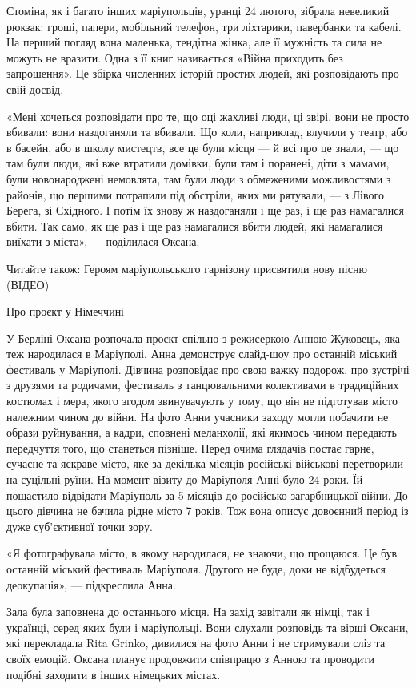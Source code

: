 Стоміна, як і багато інших маріупольців, уранці 24 лютого, зібрала невеликий
рюкзак: гроші, папери, мобільний телефон, три ліхтарики, павербанки та кабелі.
На перший погляд вона маленька, тендітна жінка, але її мужність та сила не
можуть не вразити. Одна з її книг називається «Війна приходить без запрошення».
Це збірка численних історій простих людей, які розповідають про свій досвід.

«Мені хочеться розповідати про те, що оці жахливі люди, ці звірі, вони не
просто вбивали: вони наздоганяли та вбивали. Що коли, наприклад, влучили у
театр, або в басейн, або в школу мистецтв, все це були місця — й всі про це
знали, — що там були люди, які вже втратили домівки, були там і поранені, діти
з мамами, були новонароджені немовлята, там були люди з обмеженими можливостями
з районів, що першими потрапили під обстріли, яких ми рятували, — з Лівого
Берега, зі Східного. І потім їх знову ж наздоганяли і ще раз, і ще раз
намагалися вбити. Так само, як ще раз і ще раз намагалися вбити людей, які
намагалися виїхати з міста», — поділилася Оксана.

Читайте також: Героям маріупольського гарнізону присвятили нову пісню (ВІДЕО)

Про проєкт у Німеччині

У Берліні Оксана розпочала проєкт спільно з режисеркою Анною Жуковець, яка теж
народилася в Маріуполі. Анна демонструє слайд-шоу про останній міський
фестиваль у Маріуполі. Дівчина розповідає про свою важку подорож, про зустрічі
з друзями та родичами, фестиваль з танцювальними колективами в традиційних
костюмах і мера, якого згодом звинувачують у тому, що він не підготував місто
належним чином до війни. На фото Анни учасники заходу могли побачити не образи
руйнування, а кадри, сповнені меланхолії, які якимось чином передають
передчуття того, що станеться пізніше. Перед очима глядачів постає гарне,
сучасне та яскраве місто, яке за декілька місяців російські військові
перетворили на суцільні руїни. На момент візиту до Маріуполя Анні було 24 роки.
Їй пощастило відвідати Маріуполь за 5 місяців до російсько-загарбницької війни.
До цього дівчина не бачила рідне місто 7 років. Тож вона описує довоєнний
період із дуже суб'єктивної точки зору.

«Я фотографувала місто, в якому народилася, не знаючи, що прощаюся. Це був
останній міський фестиваль Маріуполя. Другого не буде, доки не відбудеться
деокупація», — підкреслила Анна. 

Зала була заповнена до останнього місця. На захід завітали як німці, так і
українці, серед яких були і маріупольці. Вони слухали розповідь та вірші
Оксани, які перекладала Rita Grinko, дивилися на фото Анни і не стримували сліз
та своїх емоцій. Оксана планує продовжити співпрацю з Анною та проводити
подібні заходити в інших німецьких містах.

